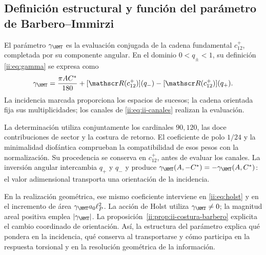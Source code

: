 \subsection{Definición estructural y función del parámetro de Barbero--Immirzi}
\label{ii:sec:ii-definicion-barbero}

\begin{definition}
El parámetro \(\gamma_{\HMT}\) es la evaluación conjugada de la
cadena fundamental \(c_{12}^{+}\), completada por su componente
angular. En el dominio \(0<q_\pm<1\), su definición
\eqref{ii:eq:gamma} se expresa como
\begin{equation}
 \gamma_{\HMT}
 =\frac{\pi AC^*}{180}
  +[\mathscr R(c_{12}^{+})](q_-)
  -[\mathscr R(c_{12}^{+})](q_+).
 \label{ii:eq:ii-definicion-barbero-evaluacion}
\end{equation}
La incidencia marcada proporciona los espacios de sucesos; la cadena
orientada fija sus multiplicidades; los canales de
\eqref{ii:eq:ii-canales} realizan la evaluación.
\end{definition}

La determinación utiliza conjuntamente los cardinales \(90,120\),
las doce contribuciones de sector y la costura de retorno. El
coeficiente de polo \(1/24\) y la minimalidad diofántica comprueban
la compatibilidad de esos pesos con la normalización. Su procedencia
se conserva en \(c_{12}^{+}\), antes de evaluar los canales. La
inversión angular intercambia \(q_+\) y \(q_-\) y produce
\(\gamma_{\HMT}(A,-C^*)=-\gamma_{\HMT}(A,C^*)\): el valor
adimensional transporta una orientación de la incidencia.

En la realización geométrica, ese mismo coeficiente interviene en
\eqref{ii:eq:holst} y en el incremento de área
\(\gamma_{\HMT}a_0\ell_P^2\). La acción de Holst utiliza
\(\gamma_{\HMT}\ne0\); la magnitud areal positiva emplea
\(|\gamma_{\HMT}|\). La proposición~\ref{ii:prop:ii-costura-barbero}
explicita el cambio coordinado de orientación. Así, la estructura
del parámetro explica qué pondera en la incidencia, qué conserva
al transportarse y cómo participa en la respuesta torsional y en
la resolución geométrica de la información.
